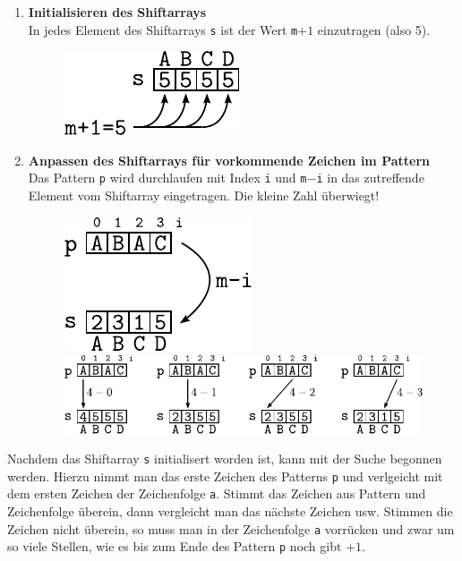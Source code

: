 \begin{enumerate}
	\item \textbf{Initialisieren des Shiftarrays} \\
		In jedes Element des Shiftarrays \verb!s! ist der
		Wert \verb!m!$+1$ einzutragen (also 5).
		\begin{figure}[h!]
			\centering
			\includegraphics[scale=0.9]{../fig/quicksearch-1.pdf} 
		\end{figure}
	\item \textbf{Anpassen des Shiftarrays für vorkommende Zeichen 
		im Pattern} \\
		Das Pattern \verb!p! wird durchlaufen mit Index \verb!i!
		und \verb!m!$-$\verb!i! in das zutreffende Element vom
		Shiftarray eingetragen. Die kleine Zahl überwiegt!
		\begin{figure}[h!]
			\centering
			\hfill{} \hfill{}
			\includegraphics[scale=0.9]{../fig/quicksearch-2.pdf}
			\hfill{}
			\includegraphics[scale=0.9]{../fig/quicksearch-3.pdf}
		\end{figure}
\end{enumerate}

\noindent
Nachdem das Shiftarray \verb!s! initialisert worden ist, kann mit der
Suche begonnen werden. Hierzu nimmt man das erste Zeichen des Patterns
\verb!p! und verlgeicht mit dem ersten Zeichen der Zeichenfolge \verb!a!.
Stimmt das Zeichen aus Pattern und Zeichenfolge überein, dann vergleicht
man das nächste Zeichen usw. Stimmen die Zeichen nicht überein, so
muss man in der Zeichenfolge \verb!a! vorrücken und zwar um so viele 
Stellen, wie es bis zum Ende des Pattern \verb!p! noch gibt $+1$.

